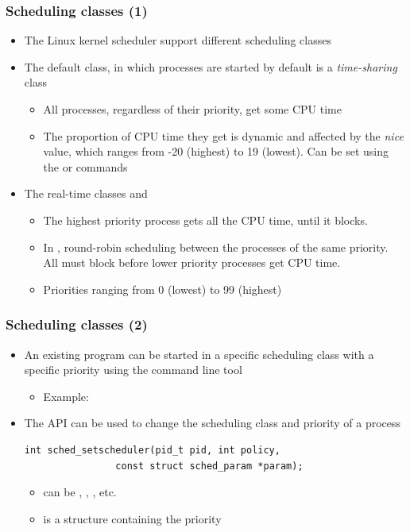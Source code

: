 \begin{frame}
  \frametitle{Scheduling classes (1)}
  \begin{itemize}
  \item The Linux kernel scheduler support different scheduling
    classes
  \item The default class, in which processes are started by default
    is a {\em time-sharing} class
    \begin{itemize}
    \item All processes, regardless of their priority, get some CPU time
    \item The proportion of CPU time they get is dynamic and affected
      by the {\em nice} value, which ranges from -20 (highest) to 19
      (lowest). Can be set using the  or  commands
    \end{itemize}
  \item The real-time classes  and 
    \begin{itemize}
    \item The highest priority process gets all the CPU time, until it
      blocks.
    \item In , round-robin scheduling between the
      processes of the same priority. All must block before lower
      priority processes get CPU time.
    \item Priorities ranging from 0 (lowest) to 99 (highest)
    \end{itemize}
  \end{itemize}
\end{frame}

\begin{frame}[fragile]
  \frametitle{Scheduling classes (2)}
  \begin{itemize}
  \item An existing program can be started in a specific scheduling
    class with a specific priority using the  command line tool
    \begin{itemize}
    \item Example: 
    \end{itemize}
  \item The  API can be used to change the scheduling class
    and priority of a process
    \begin{block}{}
\begin{verbatim}
int sched_setscheduler(pid_t pid, int policy,
                const struct sched_param *param);
\end{verbatim}
    \end{block}{}
    \begin{itemize}
    \item {} can be , ,
      , etc.
    \item {} is a structure containing the priority
    \end{itemize}
  \end{itemize}
\end{frame}

